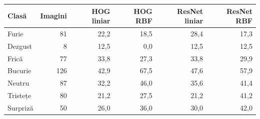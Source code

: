 \begin{tabular}{lrrrrr}
\toprule
Clasă & Imagini & HOG liniar & HOG RBF & ResNet liniar & ResNet RBF \\
\midrule
Furie & 81 & 22,2 & 18,5 & 28,4 & 17,3 \\
Dezgust & 8 & 12,5 & 0,0 & 12,5 & 12,5 \\
Frică & 77 & 33,8 & 27,3 & 33,8 & 29,9 \\
Bucurie & 126 & 42,9 & 67,5 & 47,6 & 57,9 \\
Neutru & 87 & 32,2 & 46,0 & 35,6 & 41,4 \\
Tristețe & 80 & 21,2 & 27,5 & 21,2 & 41,2 \\
Surpriză & 50 & 26,0 & 36,0 & 30,0 & 42,0 \\
\bottomrule
\end{tabular}
